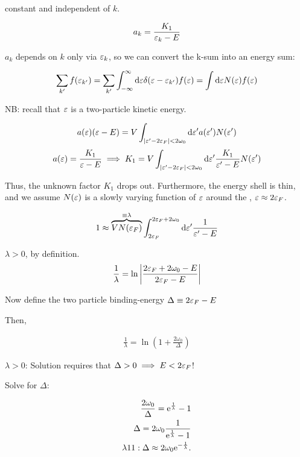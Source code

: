 constant and independent of $k$. 

\begin{align*}
a_k = \frac{K_1}{\varepsilon_k - E}
\end{align*}

$a_k$ depends on $k$ only via $\varepsilon_k$, so we can convert the k-sum into an energy sum: 

\begin{align*}
\sum_{k'}f(\varepsilon_{k'}) = \sum_{k'} \int_{-\infty}^{\infty} \dd \varepsilon  \delta(\varepsilon - \varepsilon_{k'})f(\varepsilon) = \int \dd \varepsilon N(\varepsilon) f(\varepsilon)
\end{align*}

NB: recall that $\varepsilon$ is a two-particle kinetic energy. 

\begin{align*}
a(\varepsilon)(\varepsilon - E) = V\int_{\abs{\varepsilon' - 2\varepsilon_F} < 2\omega_0} \dd \varepsilon' a(\varepsilon') N(\varepsilon') 
\end{align*}
\begin{align*}
a(\varepsilon) = \frac{K_1}{\varepsilon - E} \implies K_1 = V\int_{\abs{\varepsilon' - 2\varepsilon_F} < 2\omega_0} \dd \varepsilon' \frac{K_1}{\varepsilon' - E} N(\varepsilon') 
\end{align*}

Thus, the unknown factor $K_1$ drops out. Furthermore, the energy shell is thin, and we assume $N(\varepsilon)$ is a slowly varying function of $\varepsilon$ around the , $\varepsilon \approx 2\varepsilon_F$. 

\begin{align*}
1 \approx \overbrace{VN(\varepsilon_F)}^{\equiv \lambda} \int_{2\varepsilon_F}^{2\varepsilon_F + 2\omega_0} \dd \varepsilon' \frac{1}{\varepsilon' - E}
\end{align*}

$\lambda > 0$, by definition. \\
\begin{align*}
\frac{1}{\lambda} = \ln \abs{\frac{2\varepsilon_F + 2\omega_0 -E}{2\varepsilon_F - E}}
\end{align*}

Now define the two particle binding-energy $\Delta \equiv 2\varepsilon_F - E$

Then, 

\begin{align*}
\frac{1}{\lambda} = \ln \left(1 + \frac{2\omega_0}{\Delta}\right)
\end{align*}

$\lambda > 0$: Solution requires that $\Delta > 0 \implies E < 2\varepsilon_F$!

Solve for $\Delta$: 

\begin{align*}
\frac{2\omega_0}{\Delta} = \mathrm{e}^{\frac{1}{\lambda}} - 1 \\
\Delta = 2\omega_0 \frac{1}{\mathrm{e}^{\frac{1}{\lambda}} - 1 } \\
\lambda 1 1: \Delta \approx 2\omega_0 \mathrm{e}^{-\frac{1}{\lambda}}.
\end{align*}

